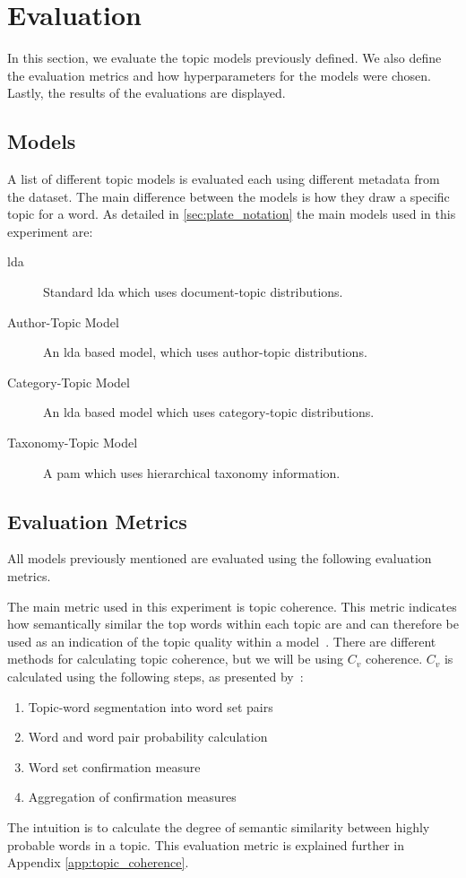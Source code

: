 \section{Evaluation}\label{sec:experiment}
In this section, we evaluate the topic models previously defined.
We also define the evaluation metrics and how hyperparameters for the models were chosen.
Lastly, the results of the evaluations are displayed.

\subsection{Models}\label{sec:experiment_models}
A list of different topic models is evaluated each using different metadata from the dataset.
The main difference between the models is how they draw a specific topic for a word.
As detailed in \autoref{sec:plate_notation} the main models used in this experiment are:
\begin{description}
	\item[\Acrlong{lda}] Standard \gls{lda} which uses document-topic distributions.
	\item[Author-Topic Model]\cite{author_topic_2012} An \gls{lda} based model, which uses author-topic distributions.
	\item[Category-Topic Model] An \gls{lda} based model which uses category-topic distributions.
	\item[Taxonomy-Topic Model] A \acrlong{pam} which uses hierarchical taxonomy information.
\end{description}

\subsection{Evaluation Metrics}\label{sec:experiment_metrics}
All models previously mentioned are evaluated using the following evaluation metrics.

The main metric used in this experiment is topic coherence.
This metric indicates how semantically similar the top words within each topic are and can therefore be used as an indication of the topic quality within a model~\cite{topic_coherence_2015}.
There are different methods for calculating topic coherence, but we will be using $C_v$ coherence.
$C_v$ is calculated using the following steps, as presented by~\citet{Syed2017coherence}:
\begin{enumerate}
	\item Topic-word segmentation into word set pairs
	\item Word and word pair probability calculation
	\item Word set confirmation measure
	\item Aggregation of confirmation measures
\end{enumerate}
The intuition is to calculate the degree of semantic similarity between highly probable words in a topic.
This evaluation metric is explained further in Appendix \autoref{app:topic_coherence}.

